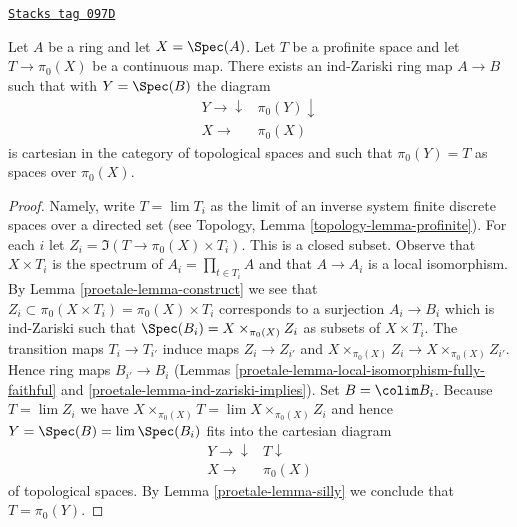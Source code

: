 \begin{lemma}
\label{proetale-lemma-construct-profinite}
\href{https://stacks.math.columbia.edu/tag/097D}{\texttt{Stacks tag 097D}}

Let $A$ be a ring and let $X = \Spec(A)$. Let $T$ be a profinite space and
let $T \to \pi_0(X)$ be a continuous map. There exists an
ind-Zariski ring map $A \to B$ such that with $Y = \Spec(B)$ the diagram
$$
\begin{array}{cc}Y \longrightarrow\downarrow & \pi_0(Y) \downarrow \\ X \longrightarrow & \pi_0(X)\end{array}
$$
is cartesian in the category of topological spaces and such that
$\pi_0(Y) = T$ as spaces over $\pi_0(X)$.
\end{lemma}

\begin{proof}

Namely, write $T = \lim T_i$ as the limit of an inverse system finite
discrete spaces over a directed set (see
Topology, Lemma \ref{topology-lemma-profinite}). For each $i$ let
$Z_i = \Im(T \to \pi_0(X) \times T_i)$. This is a closed subset.
Observe that $X \times T_i$ is the spectrum of $A_i = \prod_{t \in T_i} A$
and that $A \to A_i$ is a local isomorphism. By Lemma \ref{proetale-lemma-construct}
we see that $Z_i \subset \pi_0(X \times T_i) = \pi_0(X) \times T_i$
corresponds to a surjection $A_i \to B_i$ which is ind-Zariski
such that $\Spec(B_i) = X \times_{\pi_0(X)} Z_i$ as subsets of
$X \times T_i$. The transition maps $T_i \to T_{i'}$ induce maps
$Z_i \to Z_{i'}$ and $X \times_{\pi_0(X)} Z_i \to X \times_{\pi_0(X)} Z_{i'}$.
Hence ring maps $B_{i'} \to B_i$
(Lemmas \ref{proetale-lemma-local-isomorphism-fully-faithful} and
\ref{proetale-lemma-ind-zariski-implies}).
Set $B = \colim B_i$. Because $T = \lim Z_i$ we have
$X \times_{\pi_0(X)} T = \lim  X \times_{\pi_0(X)} Z_i$
and hence $Y = \Spec(B) = \lim \Spec(B_i)$
fits into the cartesian diagram
$$
\begin{array}{cc}Y \longrightarrow\downarrow & T \downarrow \\ X \longrightarrow & \pi_0(X)\end{array}
$$
of topological spaces. By Lemma \ref{proetale-lemma-silly}
we conclude that $T = \pi_0(Y)$.
\end{proof}

